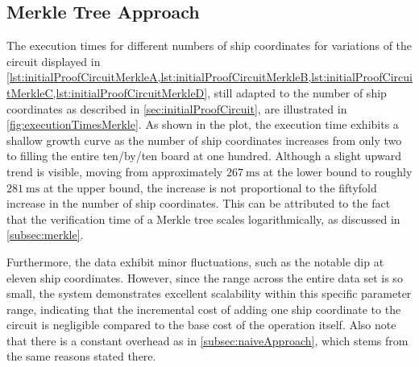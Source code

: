 \subsection{Merkle Tree Approach}

The execution times for different numbers of ship coordinates for variations of the circuit displayed in \cref{lst:initialProofCircuitMerkleA,lst:initialProofCircuitMerkleB,lst:initialProofCircuitMerkleC,lst:initialProofCircuitMerkleD}, still adapted to the number of ship coordinates as described in \cref{sec:initialProofCircuit}, are illustrated in \cref{fig:executionTimesMerkle}. As shown in the plot, the execution time exhibits a shallow growth curve as the number of ship coordinates increases from only two to filling the entire ten\-/by\-/ten board at one hundred. Although a slight upward trend is visible, moving from approximately $\qty{267}{\milli\second}$ at the lower bound to roughly $\qty{281}{\milli\second}$ at the upper bound, the increase is not proportional to the fiftyfold increase in the number of ship coordinates. This can be attributed to the fact that the verification time of a Merkle tree scales logarithmically, as discussed in \cref{subsec:merkle}.

Furthermore, the data exhibit minor fluctuations, such as the notable dip at eleven ship coordinates. However, since the range across the entire data set is so small, the system demonstrates excellent scalability within this specific parameter range, indicating that the incremental cost of adding one ship coordinate to the circuit is negligible compared to the base cost of the operation itself. Also note that there is a constant overhead as in \cref{subsec:naiveApproach}, which stems from the same reasons stated there.

